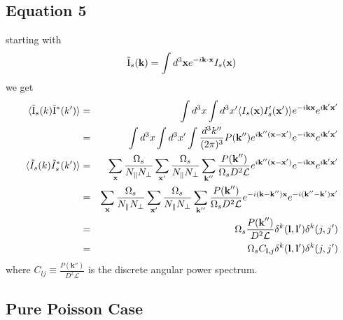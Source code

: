 \documentclass[12pt]{article}
\def\l{{\bf l}}
\def\il{{\tilde{\rm I}}}
\numberwithin{equation}{section}
\begin{document}
\subsection{Equation 5}
starting with 
\begin{eqnarray}
		\il_s(\textbf{k}) = \int d^3\textbf{x} e^{-i \textbf{k} \cdot  \textbf{x}} I_s(\textbf{x})
\end{eqnarray}
we get
\begin{eqnarray}
	\langle \il_s(k) \il^*(k')\rangle  &=& \int d^3x \int d^3 x'  \langle I_s(\textbf{x}) I_s'(\textbf{x}') \rangle e^{- i \textbf{k} \textbf{x}} e^{i \textbf{k}' \textbf{x}'}  \\
	&=& \int d^3x \int d^3 x' \int \frac{d^3 k''}{(2\pi)^3} P(\textbf{k}'') e^{i\textbf{k}'' (\textbf{x} - \textbf{x}')} e^{- i \textbf{k} \textbf{x}} e^{i \textbf{k}' \textbf{x}'} 
	 \\
	\langle \tilde{I}_s(k) \tilde{I}_s^*(k')\rangle &=&  \sum_\textbf{x} \frac{\Omega_s}{N_\parallel N_\perp} \sum_{\textbf{x}'} \frac{\Omega_s}{N_\parallel N_\perp} \sum_{\textbf{k}''} \frac{P(\textbf{k}'')}{\Omega_s D^2 \mathcal{L}}  e^{i \textbf{k}''(\textbf{x} - \textbf{x}')} e^{- i \textbf{k} \textbf{x}} e^{i \textbf{k}' \textbf{x}'} \\
	&=& \sum_\textbf{x} \frac{\Omega_s}{N_\parallel N_\perp} \sum_{\textbf{x}'} \frac{\Omega_s}{N_\parallel N_\perp} \sum_{\textbf{k}''} \frac{P(\textbf{k}'')}{\Omega_s D^2 \mathcal{L}}  e^{ -i (\textbf{k} - \textbf{k}'')\textbf{x}} e^{-i (\textbf{k}'' - \textbf{k}') \textbf{x}'} \\
	&=&  \Omega_s \frac{P(\textbf{k}'')}{D^2 \mathcal{L}}  \delta^k(\l,\l') \delta^k(j,j')\\
	&=&  \Omega_s C_{\l, j}  \delta^k(\l,\l') \delta^k(j,j')
\end{eqnarray}
where $ C_{lj} \equiv \frac{P(\textbf{k}'')}{D^2 \mathcal{L}}$ is the discrete angular power spectrum.


\subsection{Pure Poisson Case}
\end{document}
